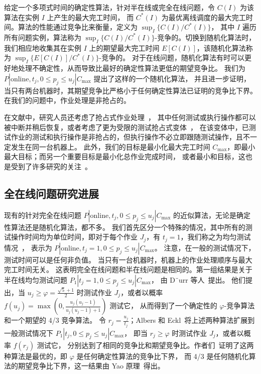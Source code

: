 给定一个多项式时间的确定性算法，针对半在线或完全在线问题，令 \( C(I) \) 为该算法在实例 \( I \) 上产生的最大完工时间，
而 \( C^*(I) \) 为最优离线调度的最大完工时间。算法的性能通过竞争比来衡量，定义为 \( \sup_I \{ C(I) / C^*(I) \} \)，
其中 \( I \) 遍历所有问题实例，算法称为 \( \sup_I \{ C(I) / C^*(I) \} \)-竞争的。切换到随机化算法时，
我们相应地收集其在实例 \( I \) 上的期望最大完工时间 \( E[C(I)] \)，该随机化算法称为 \( \sup_I \{ E[C(I)] / C^*(I) \} \)-竞争的。
对于在线问题，随机化算法有时可以更好地处理不确定性，从而导致比最好的确定性算法更低的期望竞争比。
我们为 \( P | \text{online}, t_j, 0 \leq p_j \leq u_j | C_{\text{max}} \) 提出了这样的一个随机化算法，
并且进一步证明，当只有两台机器时，其期望竞争比严格小于任何确定性算法已证明的竞争比下界。
在我们的问题中，作业处理是非抢占的。

在文献中，研究人员还考虑了抢占式作业处理~\cite{durr2018scheduling,durr2020adversarial,albers2021explorable,albers2021scheduling}，
其中任何测试或执行操作都可以被中断并稍后恢复，或者考虑了更为受限的测试抢占式变体~\cite{albers2021scheduling}，
在该变体中，已测试作业的测试和执行操作是非抢占的，但执行操作不必立即跟随测试操作，且不一定发生在同一台机器上。
此外，我们的目标是最小化最大完工时间 \( C_{\text{max}} \)，即最小最大目标；而另一个重要目标是最小化总作业完成时间，
或者最小和目标，这也是受到了许多研究的关注~\cite{durr2018scheduling,durr2020adversarial,albers2021scheduling}。


\subsection{全在线问题研究进展}

现有的针对完全在线问题 \( P | \text{online}, t_j, 0 \leq p_j \leq u_j | C_{\text{max}} \) 的近似算法，无论是确定性算法还是随机化算法，都不多。
我们首先区分一个特殊的情况，其中所有的测试操作时间均为单位时间，即对于每个作业 \( J_j \)，有 \( t_j = 1 \)，我们称之为均匀测试情况~\cite{durr2018scheduling,durr2020adversarial,albers2021scheduling}，
表示为 \( P | \text{online}, t_j = 1, 0 \leq p_j \leq u_j | C_{\text{max}} \)。
注意，在一般的测试情况下，测试时间可以是任何非负值。
当只有一台机器时，机器上的作业处理顺序与最大完工时间无关。
这表明完全在线问题和半在线问题是相同的。第一组结果是关于半在线均匀测试问题 \( P_1 | t_j = 1, 0 \leq p_j \leq u_j | C_{\text{max}} \)，
由 D¨urr 等人~\cite{durr2018scheduling,durr2020adversarial}提出。
他们提出，当 \( u_j \geq \varphi = \frac{\sqrt{5} + 1}{2} \) 时测试作业 \( J_j \)，或者以概率 \( f(u_j) = \max \left( 0, \frac{u_j(u_j - 1)}{u_j(u_j - 1) + 1} \right) \) 测试它，
从而得到了一个确定性的 \( \varphi \)-竞争算法和一个期望的 4/3 竞争算法。
令 \( r_j = \frac{u_j}{t_j} \)；Albers 和 Eckl~\cite{albers2021explorable}将上述两种算法扩展到一般测试情况下 \( P_1 | t_j, 0 \leq p_j \leq u_j | C_{\text{max}} \)，
即当 \( r_j \geq \varphi \) 时测试作业 \( J_j \)，或者以概率 \( f(r_j) \) 测试它，
分别达到了相同的竞争比和期望竞争比。作者们~\cite{durr2018scheduling,durr2020adversarial,albers2021explorable}证明了这两种算法是最优的，即 \( \varphi \) 是任何确定性算法的竞争比下界，
而 4/3 是任何随机化算法的期望竞争比下界，这一结果由 Yao 原理~\cite{yao1977probabilistic}得出。 

